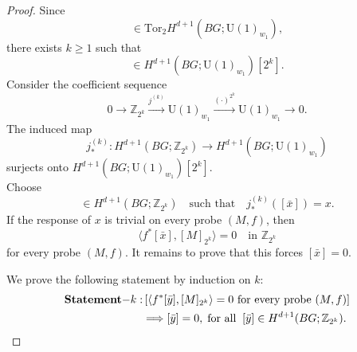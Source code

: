 \documentclass[aps,prx,reprint,superscriptaddress,twocolumn,amsmath,amssymb,amsfonts, nofootinbib]{revtex4-2}
\newcommand{\U}{\text{U}}
\newcommand{\tor}{\text{Tor}}
\theoremstyle{apsstyle}
\begin{document}
\begin{proof}
Since
\begin{equation*}
[x]\in \tor_2 H^{d+1}(BG;\U(1)_{w_1}),
\end{equation*}
there exists $k\geq1$ such that
\begin{equation*}
[x]\in H^{d+1}(BG;\U(1)_{w_1})[2^k].
\end{equation*}
Consider the coefficient sequence
\begin{equation*}
0\to \mathbb Z_{2^k}\xrightarrow{j^{(k)}} \U(1)_{w_1}
\xrightarrow{(\cdot)^{2^k}}
\U(1)_{w_1}\to0.
\end{equation*}
The induced map
\begin{equation*}
j^{(k)}_*:
H^{d+1}(BG;\mathbb Z_{2^k})
\longrightarrow
H^{d+1}(BG;\U(1)_{w_1})
\end{equation*}
surjects onto $H^{d+1}(BG;\U(1)_{w_1})[2^k]$.\\
Choose
\begin{equation*}
[\bar x]\in H^{d+1}(BG;\mathbb Z_{2^k})\quad 
\text{such that}\quad 
j^{(k)}_*([\bar x])=x.
\end{equation*}
If the response of $x$ is trivial on every probe $(M,f)$, then
\begin{equation*}
\langle f^*[\bar x],[M]_{2^k}\rangle=0
\quad\text{in }\mathbb Z_{2^k}
\end{equation*}
for every probe $(M,f)$. It remains to prove that this forces $ [\bar x]=0$.

\bigskip 

\noindent We prove the following statement by induction on $k$:
\begin{align*}
{\bf Statement-}k:&\left[
\langle f^*[\bar y],[M]_{2^k}\rangle=0
\text{ for every probe }(M,f)
\right]\\
&\Longrightarrow
[\bar y]=0, \;\text{for all}\;\; 
[\bar y]\in H^{d+1}(BG;\mathbb Z_{2^k}).
\end{align*}

\bigskip 


\end{proof}
\end{document}
